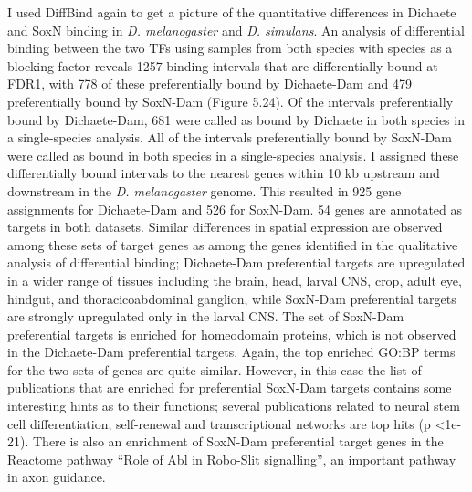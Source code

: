 I used DiffBind again to get a picture of the quantitative differences in Dichaete and SoxN binding in \emph{D. melanogaster} and \emph{D. simulans}. An analysis of differential binding between the two TFs using samples from both species with species as a blocking factor reveals 1257 binding intervals that are differentially bound at FDR1, with 778 of these preferentially bound by Dichaete-Dam and 479 preferentially bound by SoxN-Dam (Figure 5.24). Of the intervals preferentially bound by Dichaete-Dam, 681 were called as bound by Dichaete in both species in a single-species analysis. All of the intervals preferentially bound by SoxN-Dam were called as bound in both species in a single-species analysis. I assigned these differentially bound intervals to the nearest genes within 10 kb upstream and downstream in the \emph{D. melanogaster} genome. This resulted in 925 gene assignments for Dichaete-Dam and 526 for SoxN-Dam. 54 genes are annotated as targets in both datasets. Similar differences in spatial expression are observed among these sets of target genes as among the genes identified in the qualitative analysis of differential binding; Dichaete-Dam preferential targets are upregulated in a wider range of tissues including the brain, head, larval CNS, crop, adult eye, hindgut, and thoracicoabdominal ganglion, while SoxN-Dam preferential targets are strongly upregulated only in the larval CNS. The set of SoxN-Dam preferential targets is enriched for homeodomain proteins, which is not observed in the Dichaete-Dam preferential targets. Again, the top enriched GO:BP terms for the two sets of genes are quite similar. However, in this case the list of publications that are enriched for preferential SoxN-Dam targets contains some interesting hints as to their functions; several publications related to neural stem cell differentiation, self-renewal and transcriptional networks are top hits (p \textless 1e-21). There is also an enrichment of SoxN-Dam preferential target genes in the Reactome pathway “Role of Abl in Robo-Slit signalling”, an important pathway in axon guidance.\\


